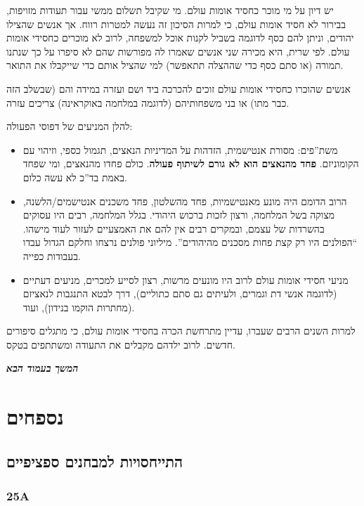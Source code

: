 \documentclass[a4paper]{book}
\newcommand\npchapter[1] {\npage\chapter{#1}\thispagestyle{empty}\newpage}
\newcommand\npage {\vfil {\hfil \textbf{\textit{המשך בעמוד הבא}}} \hfil \vfil \pagebreak}
\begin{document}
	יש דיון על מי מוכר כחסיד אומות עולם. מי שקיבל תשלום ממשי עבור תעודות מזויפות, בבירור לא חסיד אומות עולם, כי למרות הסיכון זה נעשה למטרות רווח. אך אנשים שהצילו יהודים, וניתן להם כסף לדוגמה בשביל לקנות אוכל למשפחה, לרוב לא מוכרים כחסידי אומות עולם. לפי שרית, היא מכירה שני אנשים שאמרו לה מפורשות שהם לא סיפרו על כך שנתנו תמורה (או סתם כסף כדי שההצלה תתאפשר) למי שהציל אותם כדי שייקבלו את התואר. 
	
	אנשים שהוכרו כחסידי אומות עולם זוכים להכרכה ביד ושם ועזרה במידה והם (שבשלב הזה כבר מתו) או בני משפחותיהם (לדוגמה במלחמה באוקראינה) צריכים עזרה. 
	
	להלן המניעים של דפוסי הפעולה: 
	\begin{itemize}
		\item משת''פים: מסורת אנטישמית, הזדהות על המדיניות הנאצים, תגמול כספי, וזיהוי עם הקומוניזם. \textbf{פחד מהנאצים הוא לא גורם לשיתוף פעולה}. כולם פחדו מהנאצים, ומי שפחד באמת בד''כ לא עשה כלום. 
		\item הרוב הדומם היה מונע מאנטישמיות, פחד מהשלטון, פחד משכנים אנטישמים/הלשנה, מצוקה בשל המלחמה, ורצון לזכות ברכוש היהודי. בגלל המלחמה, רבים היו עסוקים בהשרדות של עצמם, ובמקרים רבים אין להם את האמצעיים לעזור לעוד מישהו. ``הפולנים היו רק קצת פחות מסכנים מהיהודים''. מיליוני פולנים נרצחו וחלקם הגדול עבדו בעבודות כפייה. 
		\item מניעי חסידי אומות עולם לרוב היו מונעים מרשות, רצון לסייע למכרים, מניעים דעתיים (לדוגמה אנשי דת וגמרים, ולעיתים גם סתם כתוליים), דרך לבטא התנגבות לנאציזם (מחתרות הוקמו בנידון), ועוד. 
	\end{itemize}
	
	למרות השנים הרבים שעברו, עדיין מתרחשת הכרה בחסידי אומות עולם, כי מתגלים סיפורים חדשים. לרוב ילדהם מקבלים את התעודה ומשתתפים בטקס. 
	
	
	
	
	
	
	
	
	
	
	
	
	
	
	
	
	
	
	
	
	
	
	\npchapter{נספחים}
	\section{התייחסויות למבחנים ספציפיים}
	\subsection{25A}
\end{document}
